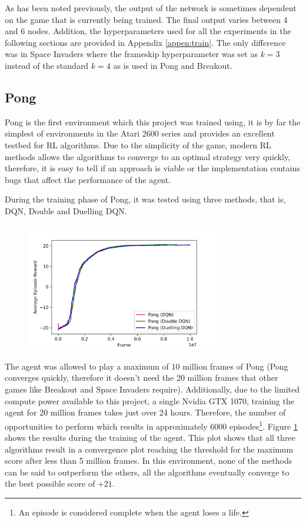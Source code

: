 As has been noted previously, the output of the network is sometimes dependent on the game that is currently being trained. The final output varies between 4 and 6 nodes. Addition, the hyperparameters used for all the experiments in the following sections are provided in Appendix \ref{appen:train}. The only difference was in Space Invaders where the frameskip hyperparameter was set as $k = 3$ instead of the standard $k = 4$ as is used in Pong and Breakout.

\subsection{Pong}
Pong is the first environment which this project was trained using, it is by far the simplest of environments in the Atari 2600 series and provides an excellent testbed for RL algorithms. Due to the simplicity of the game, modern RL methods allows the algorithms to converge to an optimal strategy very quickly, therefore, it is easy to tell if an approach is viable or the implementation contains bugs that affect the performance of the agent.

During the training phase of Pong, it was tested using three methods, that is, DQN, Double and Duelling DQN.

\begin{figure}[htbp]
  \centering
  \includegraphics[width=0.75\textwidth]{chapters/chapter5/images/pong_plot.jpg}
  \caption[Pong Training results]{
    \label{fig:pong-train-results}
  }
\end{figure}

The agent was allowed to play a maximum of 10 million frames of Pong (Pong converges quickly, therefore it doesn't need the 20 million frames that other games like Breakout and Space Invaders require). Additionally, due to the limited compute power available to this project, a single Nvidia GTX 1070, training the agent for 20 million frames takes just over 24 hours. Therefore, the number of opportunities to perform  which results in approximately 6000 episodes\footnote{An episode is considered complete when the agent loses a life.}. Figure \ref{fig:pong-train-results} shows the results during the training of the agent. This plot shows that all three algorithms result in a convergence plot reaching the threshold for the maximum score after less than 5 million frames. In this environment, none of the methods can be said to outperform the others, all the algorithms eventually converge to the best possible score of $+21$.


